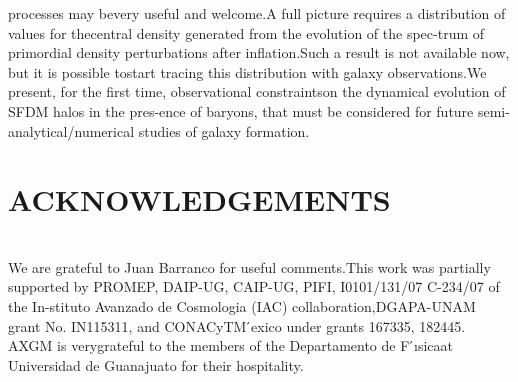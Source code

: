 \documentclass[10pt]{article}
\begin{document}
\begin{multicols}{2}
processes may bevery useful and welcome.A full picture requires a distribution of values for thecentral density generated from the evolution of the spec-trum of primordial density perturbations after inflation.Such a result is not available now,  but it is possible tostart tracing this distribution with galaxy observations.We present, for the first time, observational constraintson the dynamical evolution of SFDM halos in the pres-ence of baryons, that must be considered for future semi-analytical/numerical studies of galaxy formation.

\section*{\large \centering ACKNOWLEDGEMENTS}\\

We are grateful to Juan Barranco for useful comments.This work was partially supported by PROMEP, DAIP-UG, CAIP-UG, PIFI, I0101/131/07 C-234/07 of the In-stituto  Avanzado  de  Cosmologia  (IAC)  collaboration,DGAPA-UNAM  grant  No.   IN115311,  and  CONACyTM ́exico  under  grants  167335,  182445.   AXGM  is  verygrateful to the members of the Departamento de F ́ısicaat Universidad de Guanajuato for their hospitality.

\end{multicols}

\begin{multicols}{2}




\end{multicols}
\end{document}
